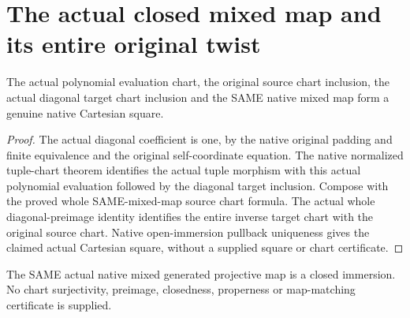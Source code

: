 \section{The actual closed mixed map and its entire original twist}
\begin{lemma}
\label{lem:central-embedding-actual-mixed-chart-is-cartesian}
\leanok
The actual polynomial evaluation chart, the original source chart inclusion,
the actual diagonal target chart inclusion and the SAME native mixed map form
a genuine native Cartesian square.
\end{lemma}
\begin{proof}
The actual diagonal coefficient is one, by the native original padding and
finite equivalence and the original self-coordinate equation. The native
normalized tuple-chart theorem identifies the actual tuple morphism with
this actual polynomial evaluation followed by the diagonal target inclusion.
Compose with the proved whole SAME-mixed-map source chart formula. The actual
whole diagonal-preimage identity identifies the entire inverse target chart
with the original source chart. Native open-immersion pullback uniqueness
gives the claimed actual Cartesian square, without a supplied square or
chart certificate.
\end{proof}
\begin{theorem}
\label{thm:central-embedding-same-actual-mixed-generated-map-closed}
\leanok
The SAME actual native mixed generated projective map is a closed immersion.
No chart surjectivity, preimage, closedness, properness or map-matching
certificate is supplied.
\end{theorem}
